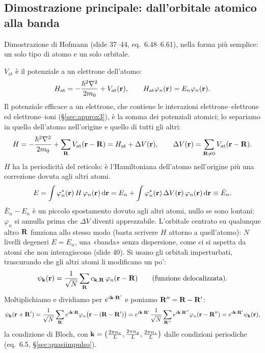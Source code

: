 \documentclass[11pt,a4paper]{article}
\begin{document}
\subsection{Dimostrazione principale: dall'orbitale atomico alla banda}\label{sec:tbdim}
Dimostrazione di Hofmann (slide 37--44, eq.~6.48--6.61), nella forma più semplice: un solo tipo di atomo e un solo orbitale.
\begin{dimostrazione}
$V_{\mathrm{at}}$ è il potenziale a un elettrone dell'atomo:
\[
H_{\mathrm{at}}=-\frac{\hbar^2\nabla^2}{2m_0}+V_{\mathrm{at}}(\mathbf r),\qquad H_{\mathrm{at}}\varphi_n(\mathbf r)=E_n\varphi_n(\mathbf r).
\]
Il potenziale efficace a un elettrone, che contiene le interazioni elettrone--elettrone ed elettrone--ioni (§\ref{sec:approx3}), è la somma dei
potenziali atomici; lo separiamo in quello dell'atomo nell'origine e quello di tutti gli altri:
\[
H=-\frac{\hbar^2\nabla^2}{2m_0}+\sum_{\mathbf R}V_{\mathrm{at}}(\mathbf r-\mathbf R)=H_{\mathrm{at}}+\Delta V(\mathbf r),\qquad \Delta V(\mathbf r)=\sum_{\mathbf R\ne0}V_{\mathrm{at}}(\mathbf r-\mathbf R).
\]
$H$ ha la periodicità del reticolo: è l'Hamiltoniana dell'atomo nell'origine più una correzione dovuta agli altri atomi.
\[
E=\int\varphi_n^*(\mathbf r)\,H\,\varphi_n(\mathbf r)\,\mathrm d\mathbf r=E_n+\int\varphi_n^*(\mathbf r)\,\Delta V(\mathbf r)\,\varphi_n(\mathbf r)\,\mathrm d\mathbf r\equiv\bar E_n .
\]
$\bar E_n-E_n$ è un piccolo spostamento dovuto agli altri atomi, nullo se sono lontani: $\varphi_n$ si annulla prima che $\Delta V$ diventi apprezzabile.
L'orbitale centrato su qualunque altro $\mathbf R$ funziona allo stesso modo (basta scrivere $H$ attorno a quell'atomo): $N$ livelli degeneri $E=E_n$, una
«banda» senza dispersione, come ci si aspetta da atomi che non interagiscono (slide 40).
Si usano gli orbitali imperturbati, trascurando che gli altri atomi li modificano un po':
\[
\psi_{\mathbf k}(\mathbf r)=\frac1{\sqrt N}\sum_{\mathbf R}c_{\mathbf k,\mathbf R}\,\varphi_n(\mathbf r-\mathbf R)\qquad(\text{funzione delocalizzata}).
\]
Moltiplichiamo e dividiamo per $e^{i\mathbf k\cdot\mathbf R'}$ e poniamo $\mathbf R''=\mathbf R-\mathbf R'$:
\[
\psi_{\mathbf k}(\mathbf r+\mathbf R')=\frac1{\sqrt N}\sum_{\mathbf R}e^{i\mathbf k\cdot\mathbf R}\varphi_n\bigl(\mathbf r-(\mathbf R-\mathbf R')\bigr)
=e^{i\mathbf k\cdot\mathbf R'}\frac1{\sqrt N}\sum_{\mathbf R''}e^{i\mathbf k\cdot\mathbf R''}\varphi_n(\mathbf r-\mathbf R'')=e^{i\mathbf k\cdot\mathbf R'}\psi_{\mathbf k}(\mathbf r),
\]
la condizione di Bloch, con $\mathbf k=\bigl(\frac{2\pi n_x}L,\frac{2\pi n_y}L,\frac{2\pi n_z}L\bigr)$ dalle condizioni periodiche (eq.~6.5, §\ref{sec:quasiimpulso}).

\end{dimostrazione}
\end{document}
